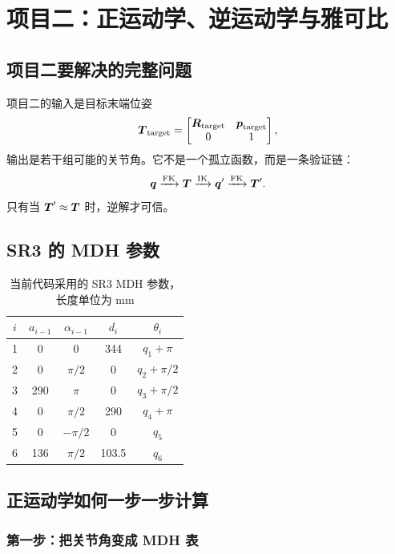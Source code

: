 \chapter{项目二：正运动学、逆运动学与雅可比}

\section{项目二要解决的完整问题}

项目二的输入是目标末端位姿
\[
\boldsymbol{T}_{\mathrm{target}}=
\begin{bmatrix}
\boldsymbol{R}_{\mathrm{target}}&\boldsymbol{p}_{\mathrm{target}}\\
0&1
\end{bmatrix},
\]
输出是若干组可能的关节角。它不是一个孤立函数，而是一条验证链：
\[
\boldsymbol{q}\xrightarrow{\mathrm{FK}}\boldsymbol{T}
\xrightarrow{\mathrm{IK}}\boldsymbol{q}'
\xrightarrow{\mathrm{FK}}\boldsymbol{T}'.
\]
只有当 $\boldsymbol{T}'\approx\boldsymbol{T}$ 时，逆解才可信。

\section{SR3 的 MDH 参数}

\begin{table}[H]
\centering
\caption{当前代码采用的 SR3 MDH 参数，长度单位为 mm}
\begin{tabular}{ccccc}
\toprule
$i$ & $a_{i-1}$ & $\alpha_{i-1}$ & $d_i$ & $\theta_i$\\
\midrule
1 & 0   & $0$             & 344   & $q_1+\pi$\\
2 & 0   & $\pi/2$         & 0     & $q_2+\pi/2$\\
3 & 290 & $\pi$           & 0     & $q_3+\pi/2$\\
4 & 0   & $\pi/2$         & 290   & $q_4+\pi$\\
5 & 0   & $-\pi/2$        & 0     & $q_5$\\
6 & 136 & $\pi/2$         & 103.5 & $q_6$\\
\bottomrule
\end{tabular}
\end{table}

\section{正运动学如何一步一步计算}

\subsection{第一步：把关节角变成 MDH 表}

